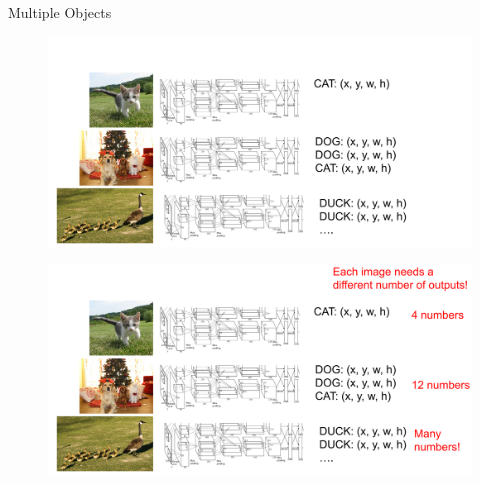 \begin{frame}[allowframebreaks]{Multiple Objects}

\begin{figure}
\centering
\includegraphics[width=1.0\textwidth,height=1.0\textheight,keepaspectratio]{images/obj-det/object_8.png}
\end{figure}

\framebreak

\begin{figure}
\centering
\includegraphics[width=1.0\textwidth,height=1.0\textheight,keepaspectratio]{images/obj-det/object_9.png}
\end{figure}

\end{frame}

